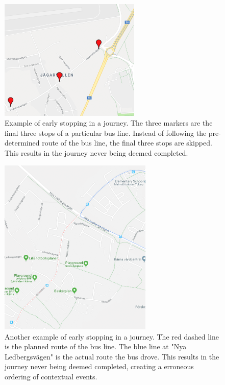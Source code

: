 \begin{figure}[t!]
    \centering
    \includegraphics[width=0.6\textwidth]{figures/edge_case_early_quit}
    \caption{Example of early stopping in a journey.
    The three markers are the final three stops of a particular bus line.
    Instead of following the pre-determined route of the bus line, the final three stops are skipped.
    This results in the journey never being deemed completed.}
    \label{fig:human-error-early-stopping-1}
\end{figure}

\begin{figure}[t!]
    \centering
    \includegraphics[width=0.65\textwidth]{figures/lazy_driver_2}
    \caption{Another example of early stopping in a journey.
    The red dashed line is the planned route of the bus line.
    The blue line at "Nya Ledbergsvägen" is the actual route the bus drove.
    This results in the journey never being deemed completed, creating a erroneous ordering of contextual events.}
    \label{fig:human-error-early-stopping-2}
\end{figure}

